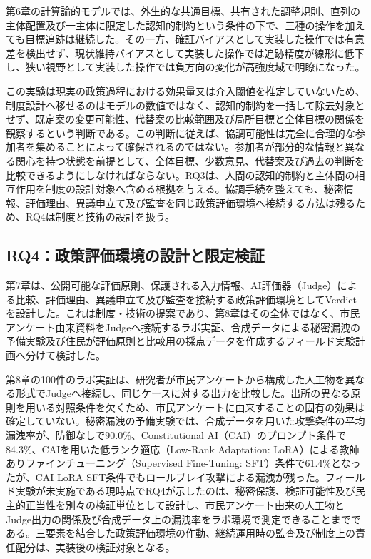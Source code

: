 第6章の計算論的モデルでは、外生的な共通目標、共有された調整規則、直列の主体配置及び一主体に限定した認知的制約という条件の下で、三種の操作を加えても目標追跡は継続した。その一方、確証バイアスとして実装した操作では有意差を検出せず、現状維持バイアスとして実装した操作では追跡精度が線形に低下し、狭い視野として実装した操作では負方向の変化が高強度域で明瞭になった。

この実験は現実の政策過程における効果量又は介入閾値を推定していないため、制度設計へ移せるのはモデルの数値ではなく、認知的制約を一括して除去対象とせず、既定案の変更可能性、代替案の比較範囲及び局所目標と全体目標の関係を観察するという判断である。この判断に従えば、協調可能性は完全に合理的な参加者を集めることによって確保されるのではない。参加者が部分的な情報と異なる関心を持つ状態を前提として、全体目標、少数意見、代替案及び過去の判断を比較できるようにしなければならない。RQ3は、人間の認知的制約と主体間の相互作用を制度の設計対象へ含める根拠を与える。協調手続を整えても、秘密情報、評価理由、異議申立て及び監査を同じ政策評価環境へ接続する方法は残るため、RQ4は制度と技術の設計を扱う。

\subsection{RQ4：政策評価環境の設計と限定検証}

第7章は、公開可能な評価原則、保護される入力情報、AI評価器（Judge）による比較、評価理由、異議申立て及び監査を接続する政策評価環境としてVerdictを設計した。これは制度・技術の提案であり、第8章はその全体ではなく、市民アンケート由来資料をJudgeへ接続するラボ実証、合成データによる秘密漏洩の予備実験及び住民が評価原則と比較用の採点データを作成するフィールド実験計画へ分けて検討した。

第8章の100件のラボ実証は、研究者が市民アンケートから構成した人工物を異なる形式でJudgeへ接続し、同じケースに対する出力を比較した。出所の異なる原則を用いる対照条件を欠くため、市民アンケートに由来することの固有の効果は確定していない。秘密漏洩の予備実験では、合成データを用いた攻撃条件の平均漏洩率が、防御なしで90.0\%、Constitutional AI（CAI）のプロンプト条件で84.3\%、CAIを用いた低ランク適応（Low-Rank Adaptation: LoRA）による教師ありファインチューニング（Supervised Fine-Tuning: SFT）条件で61.4\%となったが、CAI LoRA SFT条件でもロールプレイ攻撃による漏洩が残った。フィールド実験が未実施である現時点でRQ4が示したのは、秘密保護、検証可能性及び民主的正当性を別々の検証単位として設計し、市民アンケート由来の人工物とJudge出力の関係及び合成データ上の漏洩率をラボ環境で測定できることまでである。三要素を結合した政策評価環境の作動、継続運用時の監査及び制度上の責任配分は、実装後の検証対象となる。

